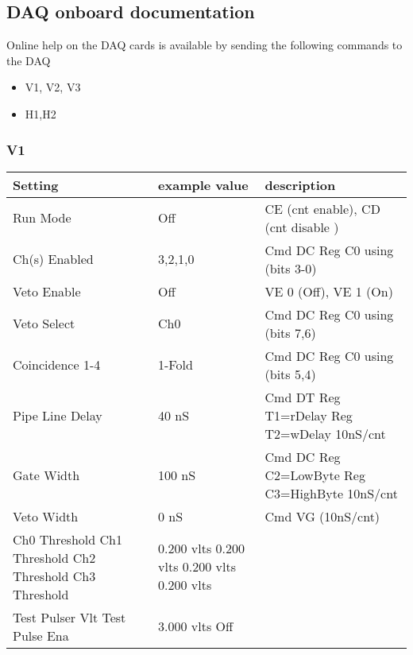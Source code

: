\documentclass[letterpaper,10pt,english]{sphinxmanual}
\begin{document}
\subsection{DAQ onboard documentation}
\label{hardware:daq-onboard-documentation}
Online help on the DAQ cards is available by sending the following commands to the DAQ
\begin{itemize}
\item {} 
V1, V2, V3

\item {} 
H1,H2

\end{itemize}


\subsubsection{V1}
\label{hardware:v1}
\begin{tabulary}{\linewidth}{|L|L|L|}
\hline
\textbf{
Setting
} & \textbf{
example value
} & \textbf{
description
}\\\hline

Run Mode
 & 
Off
 & 
CE (cnt enable), CD (cnt disable )
\\\hline

Ch(s) Enabled
 & 
3,2,1,0
 & 
Cmd DC  Reg C0 using (bits 3-0)
\\\hline

Veto Enable
 & 
Off
 & 
VE 0 (Off),  VE 1 (On)
\\\hline

Veto Select
 & 
Ch0
 & 
Cmd DC  Reg C0 using (bits 7,6)
\\\hline

Coincidence 1-4
 & 
1-Fold
 & 
Cmd DC  Reg C0 using (bits 5,4)
\\\hline

Pipe Line Delay
 & 
40 nS
 & 
Cmd DT  Reg T1=rDelay  Reg T2=wDelay  10nS/cnt
\\\hline

Gate Width
 & 
100 nS
 & 
Cmd DC  Reg C2=LowByte Reg C3=HighByte 10nS/cnt
\\\hline

Veto Width
 & 
0 nS
 & 
Cmd VG  (10nS/cnt)
\\\hline

Ch0 Threshold
Ch1 Threshold
Ch2 Threshold
Ch3 Threshold
 & 
0.200 vlts
0.200 vlts
0.200 vlts
0.200 vlts
 & \\\hline

Test Pulser Vlt
Test Pulse Ena
 & 
3.000 vlts
Off
 & \\\hline
\end{tabulary}
\end{document}
